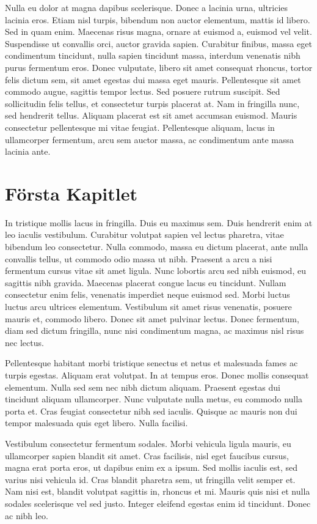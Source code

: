 \documentclass[a4paper,10pt]{article}
\begin{document}
Nulla eu dolor at magna dapibus scelerisque. Donec a lacinia urna, ultricies lacinia eros. Etiam nisl turpis, bibendum non auctor elementum, mattis id libero. Sed in quam enim. Maecenas risus magna, ornare at euismod a, euismod vel velit. Suspendisse ut convallis orci, auctor gravida sapien. Curabitur finibus, massa eget condimentum tincidunt, nulla sapien tincidunt massa, interdum venenatis nibh purus fermentum eros. Donec vulputate, libero sit amet consequat rhoncus, tortor felis dictum sem, sit amet egestas dui massa eget mauris. Pellentesque sit amet commodo augue, sagittis tempor lectus. Sed posuere rutrum suscipit. Sed sollicitudin felis tellus, et consectetur turpis placerat at. Nam in fringilla nunc, sed hendrerit tellus. Aliquam placerat est sit amet accumsan euismod. Mauris consectetur pellentesque mi vitae feugiat. Pellentesque aliquam, lacus in ullamcorper fermentum, arcu sem auctor massa, ac condimentum ante massa lacinia ante.

\section{Första Kapitlet}
In tristique mollis lacus in fringilla. Duis eu maximus sem. Duis hendrerit enim at leo iaculis vestibulum. Curabitur volutpat sapien vel lectus pharetra, vitae bibendum leo consectetur. Nulla commodo, massa eu dictum placerat, ante nulla convallis tellus, ut commodo odio massa ut nibh. Praesent a arcu a nisi fermentum cursus vitae sit amet ligula. Nunc lobortis arcu sed nibh euismod, eu sagittis nibh gravida. Maecenas placerat congue lacus eu tincidunt. Nullam consectetur enim felis, venenatis imperdiet neque euismod sed. Morbi luctus luctus arcu ultrices elementum. Vestibulum sit amet risus venenatis, posuere mauris et, commodo libero. Donec sit amet pulvinar lectus. Donec fermentum, diam sed dictum fringilla, nunc nisi condimentum magna, ac maximus nisl risus nec lectus.

Pellentesque habitant morbi tristique senectus et netus et malesuada fames ac turpis egestas. Aliquam erat volutpat. In at tempus eros. Donec mollis consequat elementum. Nulla sed sem nec nibh dictum aliquam. Praesent egestas dui tincidunt aliquam ullamcorper. Nunc vulputate nulla metus, eu commodo nulla porta et. Cras feugiat consectetur nibh sed iaculis. Quisque ac mauris non dui tempor malesuada quis eget libero. Nulla facilisi.

Vestibulum consectetur fermentum sodales. Morbi vehicula ligula mauris, eu ullamcorper sapien blandit sit amet. Cras facilisis, nisl eget faucibus cursus, magna erat porta eros, ut dapibus enim ex a ipsum. Sed mollis iaculis est, sed varius nisi vehicula id. Cras blandit pharetra sem, ut fringilla velit semper et. Nam nisi est, blandit volutpat sagittis in, rhoncus et mi. Mauris quis nisi et nulla sodales scelerisque vel sed justo. Integer eleifend egestas enim id tincidunt. Donec ac nibh leo.
\end{document}
